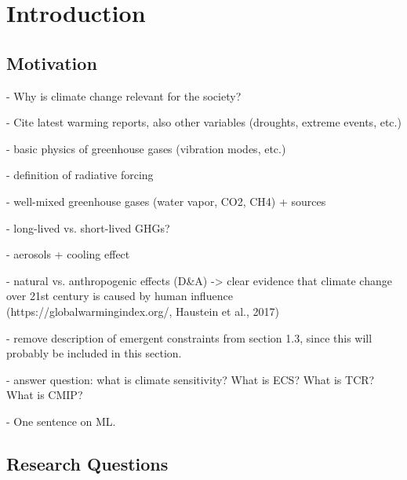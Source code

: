 


\chapter{Introduction}
\label{ch:01:introduction}


\section{Motivation}
\label{sec:01:motivation}

- Why is climate change relevant for the society?

- Cite latest warming reports, also other variables (droughts, extreme events,
etc.)

- basic physics of greenhouse gases (vibration modes, etc.)

- definition of radiative forcing

- well-mixed greenhouse gases (water vapor, CO2, CH4) + sources

- long-lived vs. short-lived GHGs?

- aerosols + cooling effect

- natural vs. anthropogenic effects (D\&A) -> clear evidence that climate
change over 21st century is caused by human influence
(https://globalwarmingindex.org/, Haustein et al., 2017)

- remove description of emergent constraints from section 1.3, since this will
probably be included in this section.

- answer question: what is climate sensitivity? What is \ac{ECS}? What is
\ac{TCR}? What is \ac{CMIP}?

- One sentence on \ac{ML}.


\section{Research Questions}
\label{sec:01:research_questions}

